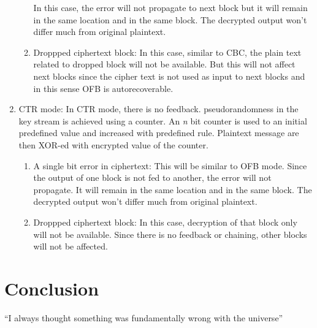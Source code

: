 \documentclass{article}
\begin{document}
\begin{enumerate}
\begin{enumerate}
                In this case, the error will not propagate to next block but it will remain in the same location and in the same block. The decrypted output won't differ much from original plaintext.
                \item Droppped ciphertext block: \newline
                In this case, similar to CBC, the plain text related to dropped block will not be available. But this will not affect next blocks since the cipher text is not used as input to next blocks and in this sense OFB is autorecoverable.
            \end{enumerate}
        \item CTR mode: In CTR mode, there is no feedback. pseudorandomness in the key stream is achieved using a counter. An \emph{n} bit counter is used to an initial predefined value and increased with predefined rule. Plaintext message are then XOR-ed with encrypted value of the counter.
            \begin{enumerate}
                \item A single bit error in ciphertext:\newline
                    This will be similar to OFB mode. Since the output of one block is not fed to another, the error will not propagate. It will remain in the same location and in the same block. The decrypted output won't differ much from original plaintext.
                \item Droppped ciphertext block: \newline
                In this case, decryption of that block only will not be available. Since there is no feedback or chaining, other blocks will not be affected.            
            \end{enumerate}
    \end{enumerate}

\section{Conclusion}
``I always thought something was fundamentally wrong with the universe'' \citep{section1question3}



\end{document}
